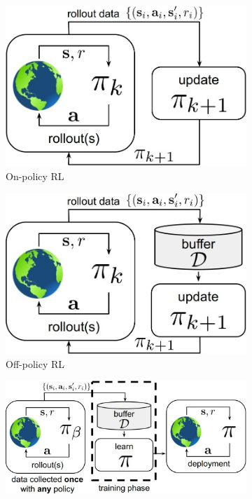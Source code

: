 \begin{figure}[htb]
     \centering
     \begin{subfigure}[b]{0.25\textwidth}
         \centering
         \includegraphics[width=\textwidth]{Figures/images/RL_methods/onpolicy.jpg}
         \caption{On-policy RL}
         \label{fig:onpolicy}
     \end{subfigure}
     \hfill
     \begin{subfigure}[b]{0.25\textwidth}
         \includegraphics[width=\textwidth]{Figures/images/RL_methods/offpolicy.jpg}
         \caption{Off-policy RL}
         \label{fig:offpolicy}
     \end{subfigure}
     \hfill
     \begin{subfigure}[b]{0.35\textwidth}
         \includegraphics[width=\textwidth]{Figures/images/RL_methods/offline.jpg}

\end{subfigure}
\end{figure}
